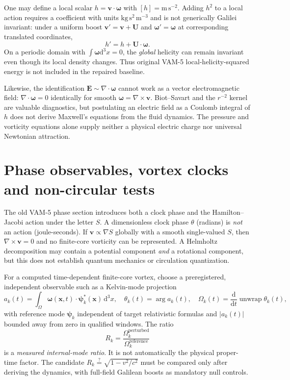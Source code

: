 \documentclass[11pt,a4paper]{article}
\newcommand{\om}{\boldsymbol{\omega}}
\newcommand{\vv}{\mathbf v}
\newcommand{\dd}{\mathrm d}
\begin{document}
One may define a local scalar $h=\vv\cdot\om$ with $[h]=\mathrm{m\,s^{-2}}$. Adding $h^2$ to a local action requires a coefficient with units $\mathrm{kg\,s^2\,m^{-3}}$ and is not generically Galilei invariant: under a uniform boost $\vv'=\vv+\mathbf U$ and $\om'=\om$ at corresponding translated coordinates,
\begin{equation}
 h'=h+\mathbf U\cdot\om.
\end{equation}
On a periodic domain with $\int\om\dd^3x=0$, the \emph{global} helicity can remain invariant even though its local density changes. Thus original VAM-5 local-helicity-squared energy is not included in the repaired baseline.

Likewise, the identification $\mathbf E\sim\nabla\cdot\om$ cannot work as a vector electromagnetic field: $\nabla\cdot\om=0$ identically for smooth $\om=\nabla\times\vv$. Biot--Savart and the $r^{-2}$ kernel are valuable diagnostics, but postulating an electric field as a Coulomb integral of $h$ does not derive Maxwell's equations from the fluid dynamics. The pressure and vorticity equations alone supply neither a physical electric charge nor universal Newtonian attraction.

\section{Phase observables, vortex clocks and non-circular tests}
The old VAM-5 phase section introduces both a clock phase and the Hamilton--Jacobi action under the letter $S$. A dimensionless clock phase $\theta$ (radians) is \emph{not} an action (joule-seconds). If $\vv\propto\nabla S$ globally with a smooth single-valued $S$, then $\nabla\times\vv=0$ and no finite-core vorticity can be represented. A Helmholtz decomposition may contain a potential component \emph{and} a rotational component, but this does not establish quantum mechanics or circulation quantization.

For a computed time-dependent finite-core vortex, choose a preregistered, independent observable such as a Kelvin-mode projection
\begin{equation}
 a_k(t)=\int_\Omega\om(\mathbf x,t)\cdot\boldsymbol\psi_k^*(\mathbf x)\,\dd^3x,
\quad\theta_k(t)=\arg a_k(t),\quad\Omega_k(t)=\frac{\dd}{\dd t}\operatorname{unwrap}\theta_k(t),
\end{equation}
with reference mode $\boldsymbol\psi_k$ independent of target relativistic formulas and $|a_k(t)|$ bounded away from zero in qualified windows. The ratio
\begin{equation}
R_k=\frac{\Omega_k^{\mathrm{perturbed}}}{\Omega_k^{\mathrm{reference}}}
\end{equation}
is a \emph{measured internal-mode ratio}. It is not automatically the physical proper-time factor. The candidate $R_k\stackrel{?}{=}\sqrt{1-v^2/c^2}$ must be compared only after deriving the dynamics, with full-field Galilean boosts as mandatory null controls.
\end{document}
